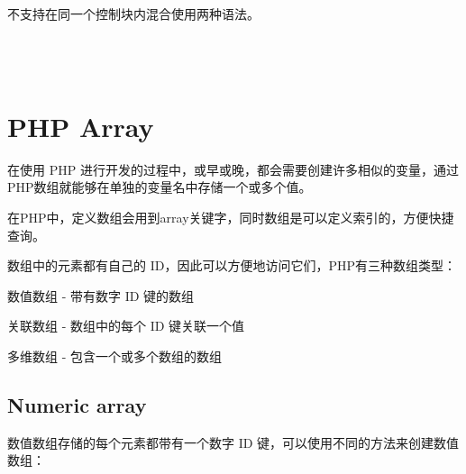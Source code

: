 不支持在同一个控制块内混合使用两种语法。




\begin{lstlisting}[language=PHP]

\end{lstlisting}




\begin{lstlisting}[language=PHP]

\end{lstlisting}




\begin{lstlisting}[language=PHP]

\end{lstlisting}




\begin{lstlisting}[language=PHP]

\end{lstlisting}

\chapter{PHP Array}



在使用 PHP 进行开发的过程中，或早或晚，都会需要创建许多相似的变量，通过PHP数组就能够在单独的变量名中存储一个或多个值。

在PHP中，定义数组会用到array关键字，同时数组是可以定义索引的，方便快捷查询。

数组中的元素都有自己的 ID，因此可以方便地访问它们，PHP有三种数组类型：

\begin{compactitem}
\item 数值数组 - 带有数字 ID 键的数组

\item 关联数组 - 数组中的每个 ID 键关联一个值

\item 多维数组 - 包含一个或多个数组的数组
\end{compactitem}






\section{Numeric array}

数值数组存储的每个元素都带有一个数字 ID 键，可以使用不同的方法来创建数值数组：

